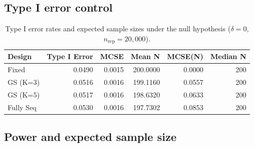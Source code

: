 \documentclass[
  11pt,
]{article}
\begin{document}
\subsection{Type I error control}\label{type-i-error-control}

\begin{table}[!h]
\centering
\caption{\label{tab:type1-table}Type I error rates and expected sample
    sizes under the null hypothesis ($\delta = 0$,
    $n_{\mathrm{rep}} = 20{,}000$).}
\centering
\fontsize{10}{12}\selectfont
\begin{tabular}[t]{lrrrrr}
\toprule
Design & Type I Error & MCSE & Mean N & MCSE(N) & Median N\\
\midrule
Fixed & 0.0490 & 0.0015 & 200.0000 & 0.0000 & 200\\
GS (K=3) & 0.0516 & 0.0016 & 199.1160 & 0.0557 & 200\\
GS (K=5) & 0.0517 & 0.0016 & 198.6320 & 0.0633 & 200\\
Fully Seq & 0.0530 & 0.0016 & 197.7302 & 0.0853 & 200\\
\bottomrule
\end{tabular}
\end{table}

\subsection{Power and expected sample size}\label{power-and-expected-sample-size}
\end{document}
